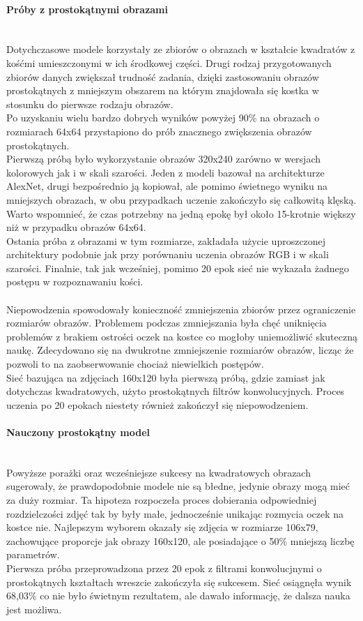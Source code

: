 \paragraph{Próby z prostokątnymi obrazami} \mbox{}\\
Dotychczasowe modele korzystały ze zbiorów o obrazach w kształcie kwadratów z kośćmi
umieszczonymi w ich środkowej części. Drugi rodzaj przygotowanych zbiorów danych zwiększał
trudność zadania, dzięki zastosowaniu obrazów prostokątnych z mniejszym obszarem na
którym znajdowała się kostka w stosunku do pierwsze rodzaju obrazów.\\
Po uzyskaniu wielu bardzo dobrych wyników powyżej 90\% na obrazach o rozmiarach 64x64
przystapiono do prób znacznego zwiększenia obrazów prostokątnych.\\
Pierwszą próbą było wykorzystanie obrazów 320x240 zarówno w wersjach kolorowych jak
i w skali szarości. Jeden z modeli bazował na architekturze AlexNet, drugi bezpośrednio
ją kopiował, ale pomimo świetnego wyniku na mniejszych obrazach, w obu przypadkach
uczenie zakończyło się całkowitą klęską. Warto wspomnieć, że czas potrzebny na
jedną epokę był około 15-krotnie większy niż w przypadku obrazów 64x64.\\
Ostania próba z obrazami w tym rozmiarze, zakładała użycie uproszczonej architektury
podobnie jak przy porównaniu uczenia obrazów RGB i w skali szarości. Finalnie, tak jak
wcześniej, pomimo 20 epok sieć nie wykazała żadnego postępu w rozpoznawaniu kości.\\\\
Niepowodzenia spowodowały konieczność zmniejszenia zbiorów przez ograniczenie rozmiarów obrazów.
Problemem podczas zmniejszania była chęć uniknięcia problemów z brakiem ostrości
oczek na kostce co mogłoby uniemożliwić skuteczną naukę. Zdecydowano się na dwukrotne
zmniejszenie rozmiarów obrazów, licząc że pozwoli to na zaobserwowanie chociaż niewielkich
postępów.\\
Sieć bazująca na zdjęciach 160x120 była pierwszą próbą, gdzie zamiast jak dotychczas
kwadratowych, użyto prostokątnych filtrów konwolucyjnych. Proces uczenia po 20 epokach
niestety również zakończył się niepowodzeniem.

\paragraph{Nauczony prostokątny model} \mbox{}\\
Powyższe porażki oraz wcześniejsze sukcesy na kwadratowych obrazach sugerowały, że
prawdopodobnie modele nie są błedne, jedynie obrazy mogą mieć za duży rozmiar. Ta hipoteza
rozpoczeła proces dobierania odpowiedniej rozdzielczości zdjęć tak by były małe, jednocześnie
unikając rozmycia oczek na kostce nie. Najlepszym wyborem okazały się zdjęcia w rozmiarze 106x79,
zachowujące proporcje jak obrazy 160x120, ale posiadające o 50\% mniejszą liczbę parametrów.\\
Pierwsza próba przeprowadzona przez 20 epok z filtrami konwolucjnymi o prostokątnych
kształtach wreszcie zakończyła się sukcesem. Sieć osiągnęła wynik 68,03\% co nie
było świetnym rezultatem, ale dawało informację, że dalsza nauka jest możliwa.


